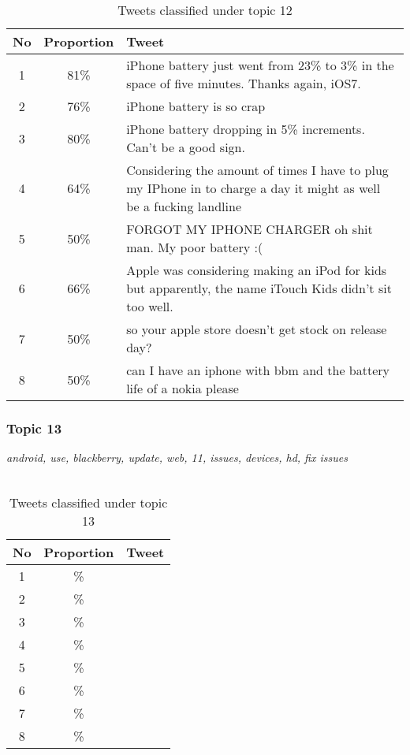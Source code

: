 \begin{table}[H]
  \begin{tabular}{c c p{13cm}} \toprule
    No & Proportion & Tweet \\ \midrule
    1  & 81\%       & iPhone battery just went from 23\% to 3\% in the space of five minutes. Thanks again, iOS7. \\ \midrule
    2  & 76\%       & iPhone battery is so crap \\ \midrule
    3  & 80\%       & iPhone battery dropping in 5\% increments. Can't be a good sign. \\ \midrule
    4  & 64\%       & Considering the amount of times I have to plug my IPhone in to charge a day it might as well be a fucking landline \\ \midrule
    5  & 50\%       & FORGOT MY IPHONE CHARGER oh shit man. My poor battery :( \\ \midrule
    6  & 66\%       & Apple was considering making an iPod for kids but apparently, the name iTouch Kids didn't sit too well. \\ \midrule
    7  & 50\%       & so your apple store doesn't get stock on release day? \\ \midrule
    8  & 50\%       & can I have an iphone with bbm and the battery life of a nokia please \\ \bottomrule
  \end{tabular}
  \caption{Tweets classified under topic 12}
  \label{tab:tweets_under_12}
\end{table}



\subsubsection{Topic 13}
\label{sec:topic_13}
\textit{android, use, blackberry, update, web, 11, issues, devices, hd, fix issues}\\\\

\begin{table}[H]
  \begin{tabular}{c c p{13cm}} \toprule
    No & Proportion & Tweet \\ \midrule
    1  & \%       & \\ \midrule
    2  & \%       & \\ \midrule
    3  & \%       & \\ \midrule
    4  & \%       & \\ \midrule
    5  & \%       & \\ \midrule
    6  & \%       & \\ \midrule
    7  & \%       & \\ \midrule
    8  & \%       & \\ \bottomrule
  \end{tabular}
  \caption{Tweets classified under topic 13}
  \label{tab:tweets_under_13}
\end{table}



